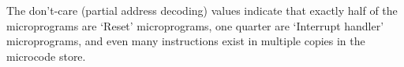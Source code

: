 

The don't-care (partial address decoding) values indicate that exactly
half of the microprograms are ‘Reset’ microprograms, one quarter are
‘Interrupt handler’ microprograms, and even many instructions exist in
multiple copies in the microcode store.

